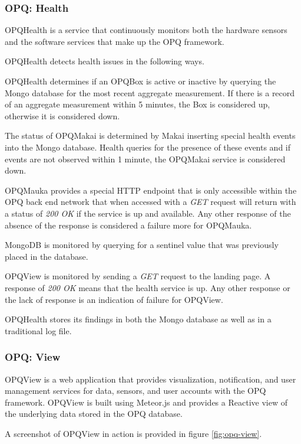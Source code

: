 \subsubsection{OPQ: Health}
OPQHealth is a service that continuously monitors both the hardware sensors and the software services that make up the OPQ framework.

OPQHealth detects health issues in the following ways. 

OPQHealth determines if an OPQBox is active or inactive by querying the Mongo database for the most recent aggregate measurement. If there is a record of an aggregate measurement within 5 minutes, the Box is considered up, otherwise it is considered down.

The status of OPQMakai is determined by Makai inserting special health events into the Mongo database. Health queries for the presence of these events and if events are not observed within 1 minute, the OPQMakai service is considered down.

OPQMauka provides a special HTTP endpoint that is only accessible within the OPQ back end network that when accessed with a \textit{GET} request will return with a status of \textit{200 OK} if the service is up and available. Any other response of the absence of the response is considered a failure more for OPQMauka.

MongoDB is monitored by querying for a sentinel value that was previously placed in the database.

OPQView is monitored by sending a \textit{GET} request to the landing page. A response of \textit{200 OK} means that the health service is up. Any other response or the lack of response is an indication of failure for OPQView.

OPQHealth stores its findings in both the Mongo database as well as in a traditional log file.

\subsubsection{OPQ: View}
OPQView is a web application that provides visualization, notification, and user management services for data, sensors, and user accounts with the OPQ framework. OPQView is built using Meteor.js and provides a Reactive view of the underlying data stored in the OPQ database.

A screenshot of OPQView in action is provided in figure \ref{fig:opq-view}.
	
